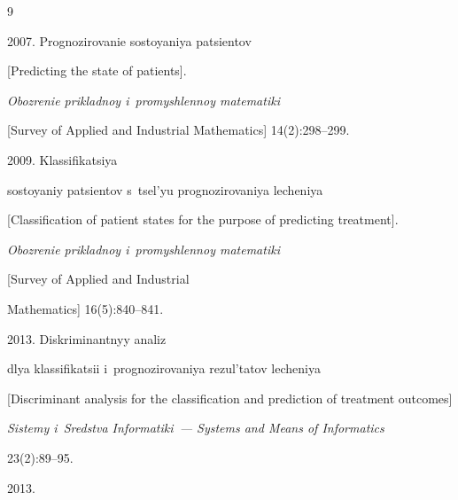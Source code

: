 \renewcommand{\bibname}{\protect\rmfamily References}




{\small\frenchspacing

{%


\begin{thebibliography}{9}



\vspace*{-1pt}





2007. Prognozirovanie sostoyaniya patsientov 

[Predicting the state of patients]. 

\textit{Obozrenie prikladnoy i~promyshlennoy matematiki} 

[Survey of Applied and Industrial Mathematics] 14(2):298--299.


 2009. Klassifikatsiya 

sostoyaniy patsientov s~tsel'yu prognozirovaniya lecheniya 

[Classification of patient states for the purpose of predicting treatment]. 

\textit{Obozrenie prikladnoy i~promyshlennoy matematiki} 

[Survey of Applied and Industrial

Mathematics] 16(5):840--841.


 2013. Diskriminantnyy analiz 

dlya klas\-si\-fi\-ka\-tsii i~prognozirovaniya rezul'tatov lecheniya 

[Discriminant analysis for the classification and prediction of treatment outcomes]

\textit{Sistemy i~Sredstva Informatiki~--- Systems and Means of Informatics} 

23(2):89--95.


 2013. 


\end{thebibliography}}}
